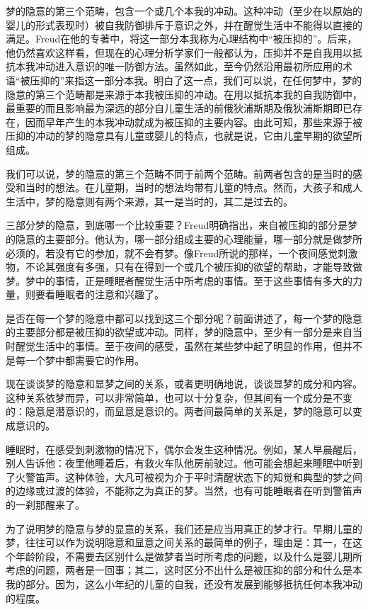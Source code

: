 \documentclass[UTF8,10pt,a4paper,openany]{book}
\begin{document}
梦的隐意的第三个范畴，包含一个或几个本我的冲动。这种冲动（至少在以原始的婴儿的形式表现时）被自我防御排斥于意识之外，并在醒觉生活中不能得以直接的满足。Freud在他的专著中，将这一部分本我称为心理结构中“被压抑的”。后来，他仍然喜欢这样看，但现在的心理分析学家们一般都认为，压抑并不是自我用以抵抗本我冲动进入意识的唯一防御方法。虽然如此，至今仍然沿用最初所应用的术语“被压抑的”来指这一部分本我。明白了这一点，我们可以说，在任何梦中，梦的隐意的第三个范畴都是来源于本我被压抑的冲动。在用以抵抗本我的自我防御中，最重要的而且影响最为深远的部分自儿童生活的前俄狄浦斯期及俄狄浦斯期即已存在，因而早年产生的本我冲动就成为被压抑的主要内容。由此可知，那些来源于被压抑的冲动的梦的隐意具有儿童或婴儿的特点，也就是说，它由儿童早期的欲望所组成。

我们可以说，梦的隐意的第三个范畴不同于前两个范畴。前两者包含的是当时的感受和当时的想法。在儿童期，当时的想法均带有儿童的特点。然而，大孩子和成人生活中，梦的隐意则有两个来源，其一是当时的，其二是过去的。

三部分梦的隐意，到底哪一个比较重要？Freud明确指出，来自被压抑的部分是梦的隐意的主要部分。他认为，哪一部分组成主要的心理能量，哪一部分就是做梦所必须的，若没有它的参加，就不会有梦。像Freud所说的那样，一个夜间感觉刺激物，不论其强度有多强，只有在得到一个或几个被压抑的欲望的帮助，才能导致做梦。梦中的事情，正是睡眠者醒觉生活中所考虑的事情。至于这些事情有多大的力量，则要看睡眠者的注意和兴趣了。

是否在每一个梦的隐意中都可以找到这三个部分呢？前面讲述了，每一个梦的隐意的主要部分都是被压抑的欲望或冲动。同样，梦的隐意中，至少有一部分是来自当时醒觉生活中的事情。至于夜间的感受，虽然在某些梦中起了明显的作用，但并不是每一个梦中都需要它的作用。

现在谈谈梦的隐意和显梦之间的关系，或者更明确地说，谈谈显梦的成分和内容。这种关系依梦而异，可以非常简单，也可以十分复杂，但其间有一个成分是不变的：隐意是潜意识的，而显意是意识的。两者间最简单的关系是，梦的隐意可以变成意识的。

睡眠时，在感受到刺激物的情况下，偶尔会发生这种情况。例如，某人早晨醒后，别人告诉他：夜里他睡着后，有救火车队他房前驶过。他可能会想起来睡眠中听到了火警笛声。这种体验，大凡可被视为介于平时清醒状态下的知觉和典型的梦之间的边缘或过渡的体验，不能称之为真正的梦。当然，也有可能睡眠者在听到警笛声的一刹那醒来了。

为了说明梦的隐意与梦的显意的关系，我们还是应当用真正的梦才行。早期儿童的梦，往往可以作为说明隐意和显意之间关系的最简单的例子，理由是：其一，在这个年龄阶段，不需要去区别什么是做梦者当时所考虑的问题，以及什么是婴儿期所考虑的问题，两者是一回事；其二，这时区分不出什么是被压抑的部分和什么是本我的部分。因为，这么小年纪的儿童的自我，还没有发展到能够抵抗任何本我冲动的程度。
\end{document}
